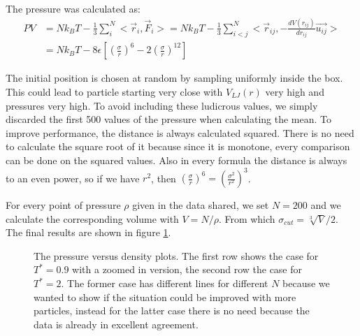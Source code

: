 \documentclass[../main.tex]{subfiles}
\begin{document}
The pressure was calculated as:
\begin{align}
    PV &= Nk_B T - \frac{1}{3}\sum_{i}^N <\overrightarrow{r}_{i}, \overrightarrow{F}_{i}> =  Nk_B T - \frac{1}{3}\sum_{i < j}^N <\overrightarrow{r}_{ij}, -\frac{dV(r_{ij})}{dr_{ij}}\overrightarrow{u_{ij}}>  \\
    &= Nk_B T - 8\epsilon\left[ \left( \frac{\sigma}{r} \right)^{6} - 2\left( \frac{\sigma}{r} \right)^{12} \right] 
\end{align}

The initial position is chosen at random by sampling uniformly inside the box. This could lead to particle starting very close with $V_{LJ}(r)$ very high and pressures very high. To avoid including these ludicrous values, we simply discarded the first 500 values of the pressure when calculating the mean.
To improve performance, the distance is always calculated squared. There is no need to calculate the square root of it because since it is monotone, every comparison can be done on the squared values. Also in every formula the distance is always to an even power, so if we have $r^2$, then $\left( \frac{\sigma}{r} \right)^{6} = \left( \frac{\sigma^2}{r^2} \right)^{3}$.

For every point of pressure $\rho$ given in the data shared, we set $N=200$ and we calculate the corresponding volume with $V=N/\rho$. From which $\sigma_{cut} = \sqrt[3]{V} / 2$. The final results are shown in figure \ref{fig: ex_8}.

\begin{figure}[H]
    \centering
    \begin{subfigure}{.6\textwidth}
        \centering
        
    \end{subfigure}
    \begin{subfigure}{.39\textwidth}
        \centering
        
    \end{subfigure}
        \begin{subfigure}{.6\textwidth}
        \centering
        
    \end{subfigure}
    \caption{The pressure versus density plots. The first row shows the case for $T^*=0.9$ with a zoomed in version, the second row the case for $T^*=2$. The former case has different lines for different $N$ because we wanted to show if the situation could be improved with more particles, instead for the latter case there is no need because the data is already in excellent agreement.}
    \label{fig: ex_8}
\end{figure}
\end{document}
